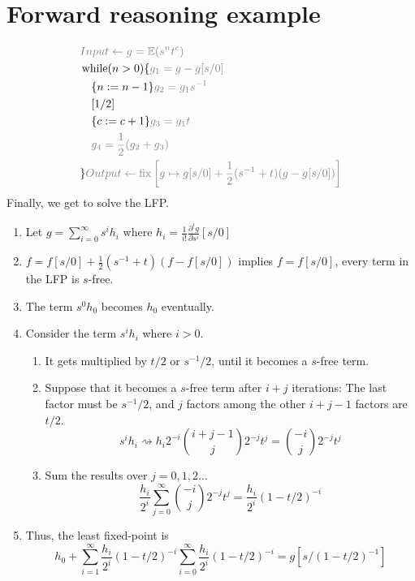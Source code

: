 \documentclass{article}
\DeclareMathOperator*{\lfp}{fix}
\newcommand{\E}{\mathbb{E}}
\newcommand{\Anno}[1]{\color{gray}{#1}}
\begin{document}
\section{Forward reasoning example}

\begin{align*}
	 & \Anno{Input \gets g = \E(s^n t^c)}                                                           \\
	 & \operatorname{while} (n>0) \{  \Anno{g_1 = g - g[s/0] }                                      \\
	 & \quad \{ n := n - 1 \} \Anno{g_2 = g_1 s^{-1}}                                               \\
	 & \quad [1/2]                                                                                  \\
	 & \quad \{ c := c + 1 \} \Anno{g_3 = g_1 t}                                                    \\
	 & \quad \Anno{g_4 = \frac12 (g_2 + g_3)}                                                       \\
	 & \} \Anno{Output \gets \lfp \left[ g \mapsto g[s/0] + \frac12(s^{-1} + t)(g-g[s/0]) \right] } \\
\end{align*}
Finally, we get to solve the LFP.
\begin{enumerate}
	\item Let \( g  = \sum_{i=0}^\infty s^i h_i \) where \(h_i = \frac{1}{i!}\frac{\partial^i g}{\partial s^i}[s/0]\)
	\item \( f = f[s/0] + \frac12(s^{-1} + t)(f-f[s/0]) \) implies \(f = f[s/0]\), every term in the LFP is \(s\)-free.
	\item The term \(s^0 h_0\) becomes \(h_0\) eventually.
	\item Consider the term \(s^i h_i\) where \(i>0\).
	      \begin{enumerate}
		      \item It gets multiplied by \(t/2\) or \(s^{-1}/2\), until it becomes a \(s\)-free term.
		      \item Suppose that it becomes a \(s\)-free term after \(i+j\) iterations:
		            The last factor must be \(s^{-1}/2\), and \(j\) factors among the other \(i+j-1\) factors are \(t/2\).
		            \[
			            s^i h_i \rightsquigarrow h_i 2^{-i} \binom{i+j-1}{j} 2^{-j}t^j = \binom{-i}{j}2^{-j} t^j
		            \]
		      \item Sum the results over \(j=0,1,2\ldots\)
		            \[
			            \frac{h_i}{2^i} \sum_{j=0}^\infty \binom{-i}{j} 2^{-j}t^j
			            = \frac{h_i}{2^i} {(1-t/2)}^{-i}
		            \]
	      \end{enumerate}
	\item Thus, the least fixed-point is
	      \[
		      h_0 + \sum_{i=1}^\infty \frac{h_i}{2^i} {(1-t/2)}^{-i}
		      \sum_{i=0}^\infty \frac{h_i}{2^i} {(1-t/2)}^{-i}
		      = g[s/{(1-t/2)}^{-1}]
	      \]
\end{enumerate}
\end{document}
